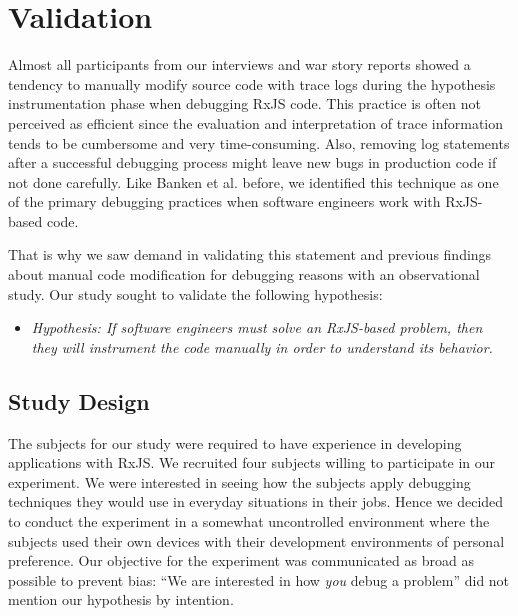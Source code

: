\documentclass[sigplan,screen,review]{acmart}
\begin{document}
\section{Validation}
\label{sec:study}

Almost all participants from our interviews and war story reports showed a tendency to manually modify source code with trace logs during the hypothesis instrumentation phase when debugging RxJS code. This practice is often not perceived as efficient since the evaluation and interpretation of trace information tends to be cumbersome and very time-consuming. Also, removing log statements after a successful debugging process might leave new bugs in production code if not done carefully. Like Banken et al. \cite{10.1145/3180155.3180156} before, we identified this technique as one of the primary debugging practices when software engineers work with RxJS-based code.

That is why we saw demand in validating this statement and previous findings about manual code modification for debugging reasons with an observational study. Our study sought to validate the following hypothesis:

\begin{itemize}
	\item \emph{Hypothesis: If software engineers must solve an RxJS-based problem, then they will instrument the code manually in order to understand its behavior.}
\end{itemize}

\subsection{Study Design}

The subjects for our study were required to have experience in developing applications with RxJS. We recruited four subjects willing to participate in our experiment. We were interested in seeing how the subjects apply debugging techniques they would use in everyday situations in their jobs. Hence we decided to conduct the experiment in a somewhat uncontrolled environment where the subjects used their own devices with their development environments of personal preference. Our objective for the experiment was communicated as broad as possible to prevent bias: ``We are interested in how \emph{you} debug a problem'' did not mention our hypothesis by intention.
\end{document}
